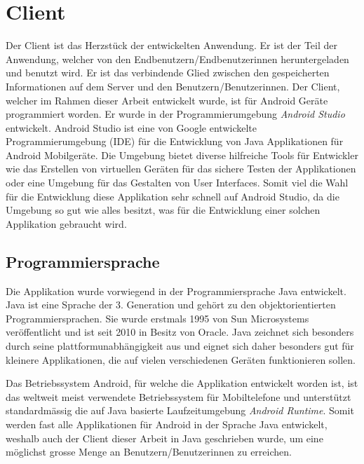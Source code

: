 \documentclass[a4paper,11pt]{report}
\begin{document}
		\section{Client} \label{client}
		Der Client ist das Herzstück der entwickelten Anwendung. Er ist der Teil der Anwendung, welcher von den Endbenutzern/Endbenutzerinnen heruntergeladen und benutzt wird. Er ist das verbindende Glied zwischen den gespeicherten Informationen auf dem Server und den Benutzern/Benutzerinnen. Der Client, welcher im Rahmen dieser Arbeit entwickelt wurde, ist für Android Geräte programmiert worden. Er wurde in der Programmierumgebung \emph{Android Studio} entwickelt. Android Studio ist eine von Google entwickelte Programmierumgebung (IDE) für die Entwicklung von Java Applikationen für Android Mobilgeräte. Die Umgebung bietet diverse hilfreiche Tools für Entwickler wie das Erstellen von virtuellen  Geräten für das sichere Testen der Applikationen oder eine Umgebung für das Gestalten von User Interfaces. Somit viel die Wahl für die Entwicklung diese Applikation sehr schnell auf Android Studio, da die Umgebung so gut wie alles besitzt, was für die Entwicklung einer solchen Applikation gebraucht wird.
			\subsection{Programmiersprache}
			Die Applikation wurde vorwiegend in der Programmiersprache Java entwickelt. Java ist eine Sprache der 3. Generation und gehört zu den objektorientierten Programmiersprachen. Sie wurde erstmals 1995 von Sun Microsystems veröffentlicht und ist seit 2010 in Besitz von Oracle. Java zeichnet sich besonders durch seine plattformunabhängigkeit aus und eignet sich daher besonders gut für kleinere Applikationen, die auf vielen verschiedenen Geräten funktionieren sollen.
			
			Das Betriebssystem Android, für welche die Applikation entwickelt worden ist, ist das weltweit meist verwendete Betriebssystem für Mobiltelefone und unterstützt standardmässig die auf Java basierte Laufzeitumgebung \emph{Android Runtime}. Somit werden fast alle Applikationen für Android in der Sprache Java entwickelt, weshalb auch der Client dieser Arbeit in Java geschrieben wurde, um eine möglichst grosse Menge an Benutzern/Benutzerinnen zu erreichen.\cite{android}
			
\end{document}
